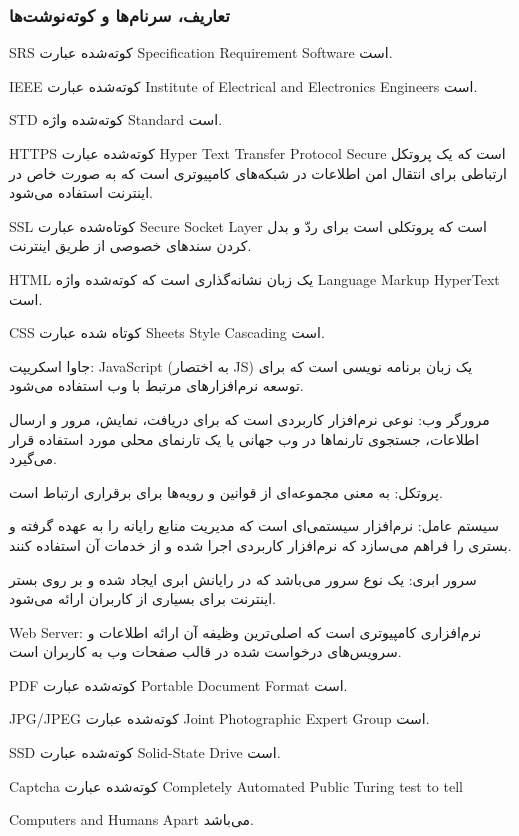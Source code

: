 \documentclass[12pt]{article}
\begin{document}
	\subsubsection{تعاریف، سرنام‌ها و کوته‌نوشت‌ها}

		SRS کوته‌شده عبارت Specification Requirement Software است.

		IEEE کوته‌شده عبارت Institute of Electrical and Electronics Engineers است.

		STD کوته‌شده واژه Standard است.

		HTTPS کوته‌شده عبارت Hyper Text Transfer Protocol Secure است که یک پروتکل ارتباطی برای انتقال امن اطلاعات در شبکه‌های کامپیوتری است که به صورت خاص در اینترنت استفاده می‌شود.

		SSL کوتاه‌شده عبارت Secure Socket Layer است که پروتکلی است برای ردّ و بدل کردن سندهای خصوصی از طریق اینترنت.

		HTML یک زبان نشانه‌گذاری است که کوته‌شده واژه Language Markup HyperText است.

		CSS کوتاه شده عبارت Sheets Style Cascading است.

		جاوا اسکریپت: JavaScript (به اختصار JS) یک زبان برنامه نویسی است که برای توسعه نرم‌افزارهای مرتبط با وب استفاده می‌شود.

		مرورگر وب: نوعی نرم‌افزار کاربردی است که برای دریافت، نمایش، مرور و ارسال اطلاعات، جستجوی تارنماها در وب جهانی یا یک تارنمای محلی مورد استفاده قرار می‌گیرد.

		پروتکل: به معنی مجموعه‌ای از قوانین و رویه‌ها برای برقراری ارتباط است.

		سیستم عامل: نرم‌افزار سیستمی‌ای است که مدیریت منابع رایانه را به عهده گرفته و بستری را فراهم می‌سازد که نرم‌افزار کاربردی اجرا شده و از خدمات آن استفاده کنند.

		سرور ابری: یک نوع سرور می‌باشد که در رایانش ابری ایجاد شده و بر روی بستر اینترنت برای بسیاری از کاربران ارائه می‌شود.

		Web Server: نرم‌افزاری کامپیوتری است که اصلی‌ترین وظیفه آن ارائه اطلاعات و سرویس‌های درخواست شده در قالب صفحات وب به کاربران است.

		PDF کوته‌شده عبارت Portable Document Format است.

		JPG/JPEG کوته‌شده عبارت Joint Photographic Expert Group است.

		SSD کوته‌شده‌ عبارت Solid-State Drive است.

		Captcha کوته‌شده عبارت Completely Automated Public Turing test to tell

		Computers and Humans Apart می‌باشد.
\end{document}
